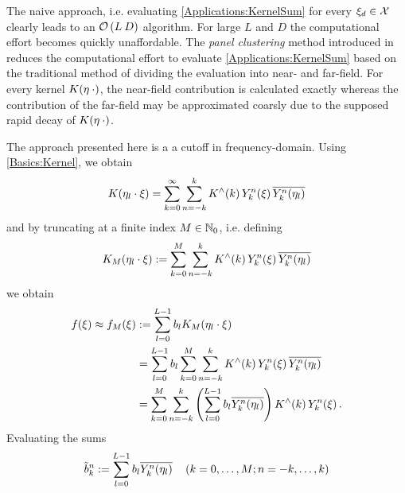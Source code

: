 \documentclass[11pt,a4paper,twoside,bibtotoc]{scrartcl}
\theoremstyle{plain}
\theoremstyle{definition}
\theoremstyle{remark}
\numberwithin{equation}{section}
\numberwithin{table}{section}
\numberwithin{figure}{section}
\begin{document}
The naive approach, i.e. evaluating \eqref{Applications:KernelSum} for every $\mathbf{\xi}_{d} \in \mathcal{X}$ clearly leads to an $\mathcal{O}\left(L\:D\right)$ algorithm. For large $L$ and $D$ the computational effort becomes quickly unaffordable.
The \emph{panel clustering} method introduced in \cite{FrGlSch98} reduces the computational effort to evaluate \eqref{Applications:KernelSum} based on the traditional method of dividing the evaluation into near- and far-field. For every kernel $K{\hspace{-0.4ex}}\left(\mathbf{\eta} \: \cdot\right)$, the near-field contribution is calculated exactly whereas the contribution of the far-field may be approximated coarsly due to the supposed rapid decay of $K{\hspace{-0.4ex}}\left(\mathbf{\eta} \: \cdot\right)$. 

The approach presented here is a a cutoff in frequency-domain. Using \eqref{Basics:Kernel}, we obtain
\[
  K{\hspace{-0.4ex}}\left(\mathbf{\eta}_{l} \cdot \mathbf{\xi}\right) = \sum_{k=0}^{\infty} \sum_{n=-k}^k K^{\wedge}{\hspace{-0.4ex}}\left(k\right) Y_{k}^n{\hspace{-0.4ex}}\left(\mathbf{\xi}\right) \overline{Y_{k}^n{\hspace{-0.4ex}}\left(\mathbf{\eta}_{l}\right)}
\]
and by truncating at a finite index $M \in \mathbb{N}_{0}$, i.e. defining
\begin{equation}
  \label{Applications:TruncatedSeries}
  K_{M}{\hspace{-0.4ex}}\left(\mathbf{\eta}_{l} \cdot \mathbf{\xi}\right) := 
  \sum_{k=0}^{M} \sum_{n=-k}^k K^{\wedge}{\hspace{-0.4ex}}\left(k\right) Y_{k}^n{\hspace{-0.4ex}}\left(\mathbf{\xi}\right) \overline{Y_{k}^n{\hspace{-0.4ex}}\left(\mathbf{\eta}_{l}\right)}
\end{equation}
we obtain
\begin{equation}
  \nonumber
  \begin{split}
    f{\hspace{-0.4ex}}\left(\xi\right) \approx f_{M}{\hspace{-0.4ex}}\left(\xi\right) & := \sum_{l = 0}^{L-1} b_{l} K_{M}{\hspace{-0.4ex}}\left(\mathbf{\eta}_{l} \cdot \mathbf{\xi}\right) \\
                 &       = \sum_{l = 0}^{L-1} b_{l} \sum_{k=0}^{M} \sum_{n=-k}^k K^{\wedge}{\hspace{-0.4ex}}\left(k\right)
                           Y_{k}^n{\hspace{-0.4ex}}\left(\mathbf{\xi}\right) \overline{Y_{k}^n{\hspace{-0.4ex}}\left(\mathbf{\eta}_{l}\right)} \\
                 &       = \sum_{k=0}^{M} \sum_{n=-k}^k \left(\sum_{l = 0}^{L-1} b_{l}
                           \overline{Y_{k}^n{\hspace{-0.4ex}}\left(\mathbf{\eta}_{l}\right)}\right) K^{\wedge}{\hspace{-0.4ex}}\left(k\right) Y_{k}^n{\hspace{-0.4ex}}\left(\mathbf{\xi}\right).
  \end{split}                           
\end{equation}
Evaluating the sums
\begin{equation}
\label{Applications:AdjointNDSFT}
  \tilde{b}_{k}^n := \sum_{l = 0}^{L-1} b_{l} \overline{Y_{k}^n{\hspace{-0.4ex}}\left(\mathbf{\eta}_{l}\right)} \quad \left(k = 0,\ldots,M; n = -k,\ldots,k\right)
\end{equation}
\end{document}

